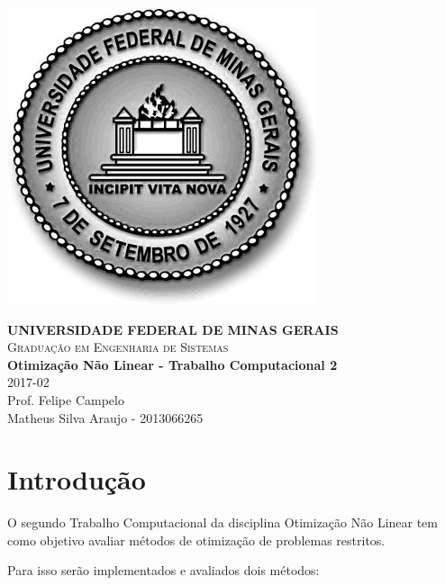 \documentclass[10pt,a4paper]{article}
\begin{document}

	\begin{minipage}[b]{0.05\linewidth}
			\includegraphics[scale=0.3]{ufmg}
	\end{minipage}
	\hfill
	\begin{minipage}[b]{0.95\linewidth}
		\begin{flushright}
			\textbf{UNIVERSIDADE FEDERAL DE MINAS GERAIS} \\
			\textsc{Graduação em Engenharia de Sistemas} \\
			\textbf{Otimização Não Linear - Trabalho Computacional 2} \\
			2017-02 \\
			Prof. Felipe Campelo \\
			Matheus Silva Araujo - 2013066265
		\end{flushright}
	\end{minipage}

	\begin{center}
		\hrulefill
	\end{center}


	\section{Introdução}

	O segundo Trabalho Computacional da disciplina Otimização Não Linear tem como objetivo avaliar métodos de otimização de problemas restritos.

	Para isso serão implementados e avaliados dois métodos:
\end{document}
